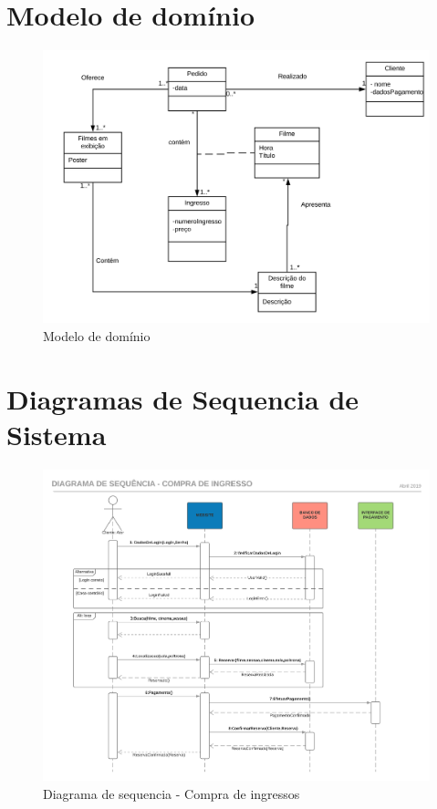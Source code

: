 \documentclass[12pt]{article}
\begin{document}
\section{Modelo de domínio}
    
    \begin{figure}[h]
        \centering
        \includegraphics[scale=0.18]{./Imagens/ModeloDeDominio.png}
        \caption{Modelo de domínio}
        \label{fig:ModeloDeDominio}
    \end{figure}
    \FloatBarrier

\section{Diagramas de Sequencia de Sistema}

    \begin{figure}[h]
        \centering
        \includegraphics[scale=0.5]{./Imagens/DiagramasDeSequencia/DiagramaDeSequencia1.png}
        \caption{Diagrama de sequencia - Compra de ingressos}
        \label{fig:DiagramaSequencia01}
    \end{figure}
\end{document}
